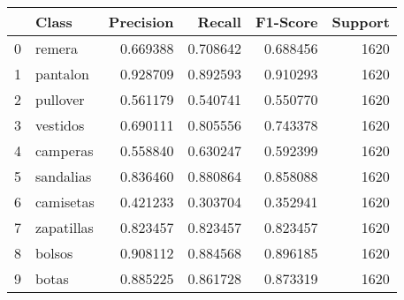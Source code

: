 \begin{tabular}{llrrrr}
\toprule
 & Class & Precision & Recall & F1-Score & Support \\
\midrule
0 & remera & 0.669388 & 0.708642 & 0.688456 & 1620 \\
1 & pantalon & 0.928709 & 0.892593 & 0.910293 & 1620 \\
2 & pullover & 0.561179 & 0.540741 & 0.550770 & 1620 \\
3 & vestidos & 0.690111 & 0.805556 & 0.743378 & 1620 \\
4 & camperas & 0.558840 & 0.630247 & 0.592399 & 1620 \\
5 & sandalias & 0.836460 & 0.880864 & 0.858088 & 1620 \\
6 & camisetas & 0.421233 & 0.303704 & 0.352941 & 1620 \\
7 & zapatillas & 0.823457 & 0.823457 & 0.823457 & 1620 \\
8 & bolsos & 0.908112 & 0.884568 & 0.896185 & 1620 \\
9 & botas & 0.885225 & 0.861728 & 0.873319 & 1620 \\
\bottomrule
\end{tabular}
